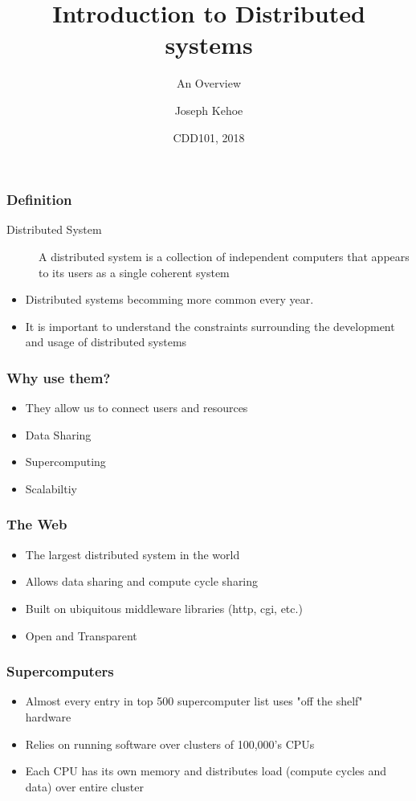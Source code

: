 \documentclass{beamer}
\title[Distributed Systems] %
{Introduction to Distributed systems}
\subtitle{An Overview}
\author[Dr. Joseph Kehoe] %
{Joseph Kehoe\inst{1}}
\institute[IT Carlow] %
{
	\inst{1}%
	Department of Computing and Networking\\
	Institute of Technology Carlow
}
\date[ITC 2018] %
{CDD101, 2018}
\begin{document}
 
\frame{\titlepage}
 
 
 


  \begin{frame}
  	\frametitle{Definition}
  	\begin{description}
  		\item[Distributed System] A distributed system is a collection of independent computers that appears to its users as a single coherent system
  	\end{description}
\begin{itemize}
	\item   	Distributed systems becomming more common every year. 
  	\item It is important to understand the constraints surrounding the development and usage of distributed systems
\end{itemize}
  	
  \end{frame}
  \begin{frame}
  	\frametitle{Why use them?}
  	\begin{itemize}
  		\item They allow us to connect users and resources
  		\item Data Sharing
  		\item Supercomputing
  		\item Scalabiltiy
  	\end{itemize}
  \end{frame}
  \begin{frame}
  	\frametitle{The Web}
  	\begin{itemize}
  		\item The largest distributed system in the world
  		\item Allows data sharing and compute cycle sharing
  		\item Built on ubiquitous middleware libraries (http, cgi, etc.)
  		\item Open and Transparent
  	\end{itemize}
  \end{frame}
    \begin{frame}
    	\frametitle{Supercomputers}
    	\begin{itemize}
    		\item Almost every entry in top 500 supercomputer list uses "off the shelf" hardware
    		\item Relies on running software over clusters of 100,000's CPUs
    		\item Each CPU has its own memory and distributes load (compute cycles and data) over entire cluster
    	\end{itemize}
    \end{frame}
\end{document}
